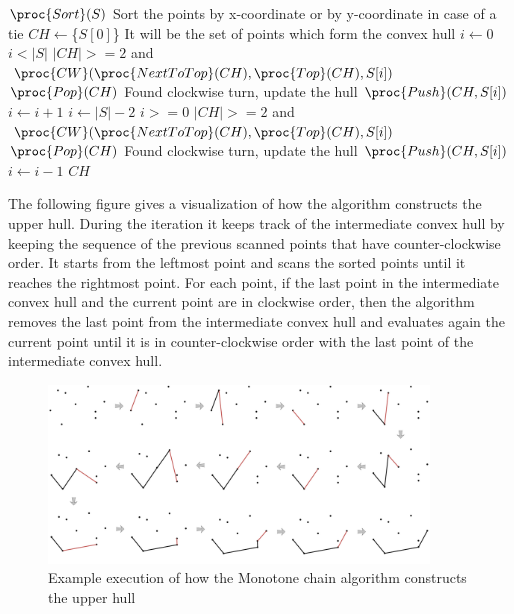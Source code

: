\documentclass{article}
\begin{document}
\begin{codebox}
\li $\proc{Sort}(S)$ \Comment Sort the points by x-coordinate or by y-coordinate in case of a tie
\li $CH \gets $\{$S[0]$\} \Comment It will be the set of points which form the convex hull
\li $i \gets 0$
\li \While $i < |S|$
    \Do
\li     \If $|CH| >= 2$ and $ \proc{CW}(\proc{NextToTop}(CH), \proc{Top}(CH), S[i])$
        \Then
\li         $\proc{Pop}(CH)$ \Comment Found clockwise turn, update the hull
\li        \Else
\li            $\proc{Push}(CH, S[i])$
\li            $i \gets i+1$
        \End
    \End
\li
\li $i \gets |S|-2$
\li \While $i >= 0$
    \Do
\li     \If $|CH| >= 2$ and $\proc{CW}(\proc{NextToTop}(CH), \proc{Top}(CH), S[i])$
        \Then
\li         $\proc{Pop}(CH)$ \Comment Found clockwise turn, update the hull
\li     \Else
\li         $\proc{Push}(CH, S[i])$
\li         $i \gets i-1$
        \End
    \End
\li
\li \Return $CH$
\end{codebox}

The following figure gives a visualization of how the algorithm constructs the upper hull. During the iteration it keeps track of the intermediate convex hull by keeping the sequence of the previous scanned points that have counter-clockwise order. It starts from the leftmost point and scans the sorted points until it reaches the rightmost point. For each point, if the last point in the intermediate convex hull and the current point are in clockwise order, then the algorithm removes the last point from the intermediate convex hull and evaluates again the current point until it is in counter-clockwise order with the last point of the intermediate convex hull.

\begin{figure}[h]
\centering
\includegraphics[width=0.9\textwidth]{monotone/monotone_visual.png}
\caption{\label{fig:monotone_visual}Example execution of how the Monotone chain algorithm constructs the upper hull}
\end{figure}
\end{document}
